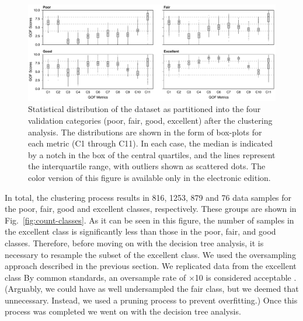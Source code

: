 \begin{figure}
	\centering
	\includegraphics[width=\textwidth]{figures/pdf/figure-06_mod}
	\caption{Statistical distribution of the dataset as partitioned into the four validation categories (poor, fair, good, excellent) after the clustering analysis. The distributions are shown in the form of box-plots for each metric (C1 through C11). In each case, the median is indicated by a notch in the box of the central quartiles, and the lines represent the interquartile range, with outliers shown as scattered dots. The color version of this figure is available only in the electronic edition. }
	\label{fig:boxed-clusters}
\end{figure}

In total, the clustering process results in 816, 1253, 879 and 76 data samples for the poor, fair, good and excellent classes, respectively. These groups are shown in Fig.~\ref{fig:count-classes}. As it can be seen in this figure, the number of samples in the excellent class is significantly less than those in the poor, fair, and good classes. Therefore, before moving on with the decision tree analysis, it is necessary to resample the subset of the excellent class. We used the oversampling approach described in the previous section. We replicated data from the excellent class   By common standards, an oversample rate of $\times$10 is considered acceptable \citep{Weiss_2003_JAIR}. (Arguably, we could have as well undersampled the fair class, but we deemed that unnecessary. Instead, we used a   pruning process to prevent overfitting.) Once this process was completed we went on with the decision tree analysis. 

